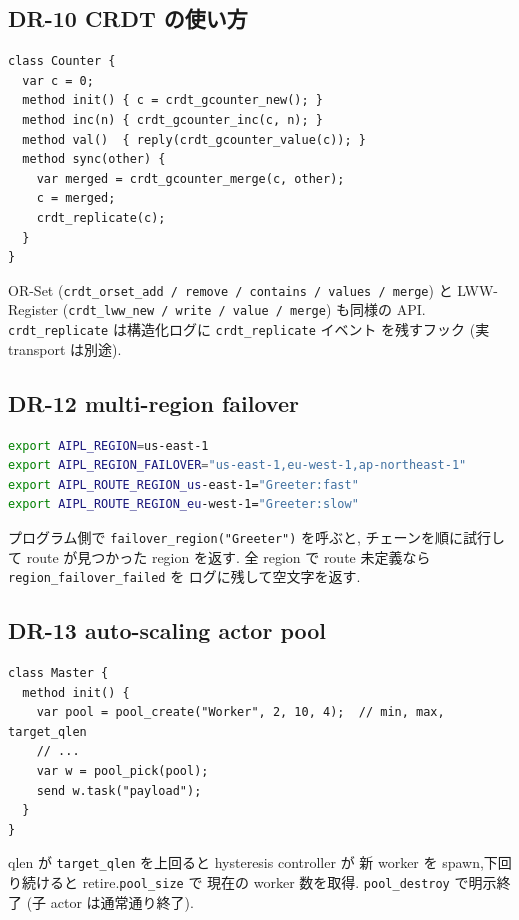 \documentclass[11pt,a4paper]{article}
\begin{document}
\subsection{DR-10 CRDT の使い方}

\begin{lstlisting}
class Counter {
  var c = 0;
  method init() { c = crdt_gcounter_new(); }
  method inc(n) { crdt_gcounter_inc(c, n); }
  method val()  { reply(crdt_gcounter_value(c)); }
  method sync(other) {
    var merged = crdt_gcounter_merge(c, other);
    c = merged;
    crdt_replicate(c);
  }
}
\end{lstlisting}

\noindent OR-Set (\texttt{crdt\_orset\_add / remove / contains / values / merge}) と
LWW-Register (\texttt{crdt\_lww\_new / write / value / merge}) も同様の API.
\texttt{crdt\_replicate} は構造化ログに \texttt{crdt\_replicate} イベント
を残すフック (実 transport は別途).

\subsection{DR-12 multi-region failover}

\begin{lstlisting}[language=bash]
export AIPL_REGION=us-east-1
export AIPL_REGION_FAILOVER="us-east-1,eu-west-1,ap-northeast-1"
export AIPL_ROUTE_REGION_us-east-1="Greeter:fast"
export AIPL_ROUTE_REGION_eu-west-1="Greeter:slow"
\end{lstlisting}

\noindent プログラム側で \texttt{failover\_region("Greeter")} を呼ぶと,
チェーンを順に試行して route が見つかった region を返す.
全 region で route 未定義なら \texttt{region\_failover\_failed} を
ログに残して空文字を返す.

\subsection{DR-13 auto-scaling actor pool}

\begin{lstlisting}
class Master {
  method init() {
    var pool = pool_create("Worker", 2, 10, 4);  // min, max, target_qlen
    // ...
    var w = pool_pick(pool);
    send w.task("payload");
  }
}
\end{lstlisting}

\noindent qlen が \texttt{target\_qlen} を上回ると hysteresis controller が
新 worker を spawn,下回り続けると retire.\texttt{pool\_size} で
現在の worker 数を取得. \texttt{pool\_destroy} で明示終了 (子 actor
は通常通り終了).
\end{document}

